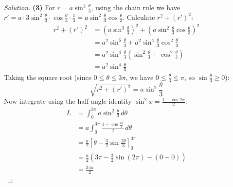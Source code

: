 \documentclass[11pt]{article}
\theoremstyle{definition}
\newenvironment{solution}{\begin{proof}[Solution]}{\end{proof}}
\begin{document}
\begin{solution}
\textbf{(3)} For $r=a\sin^3\frac{\theta}{3}$, using the chain rule we have $r' = a \cdot 3\sin^2\frac{\theta}{3} \cdot \cos\frac{\theta}{3} \cdot \frac{1}{3} = a\sin^2\frac{\theta}{3}\cos\frac{\theta}{3}$.
Calculate $r^2 + (r')^2$:
\begin{align*}
r^2 + (r')^2 &= \left(a\sin^3\frac{\theta}{3}\right)^2 + \left(a\sin^2\frac{\theta}{3}\cos\frac{\theta}{3}\right)^2 \\
&= a^2\sin^6\frac{\theta}{3} + a^2\sin^4\frac{\theta}{3}\cos^2\frac{\theta}{3} \\
&= a^2\sin^4\frac{\theta}{3} \left(\sin^2\frac{\theta}{3} + \cos^2\frac{\theta}{3}\right) \\
&= a^2\sin^4\frac{\theta}{3}
\end{align*}
Taking the square root (since $0 \leq \theta \leq 3\pi$, we have $0 \leq \frac{\theta}{3} \leq \pi$, so $\sin\frac{\theta}{3} \geq 0$):
\[
\sqrt{r^2 + (r')^2} = a\sin^2\frac{\theta}{3}
\]
Now integrate using the half-angle identity $\sin^2 x = \frac{1-\cos2x}{2}$:
\begin{align*}
L &= \int_{0}^{3\pi} a\sin^2\frac{\theta}{3} \,d\theta \\
&= a \int_{0}^{3\pi} \frac{1 - \cos\frac{2\theta}{3}}{2} \,d\theta \\
&= \frac{a}{2} \left[ \theta - \frac{3}{2}\sin\frac{2\theta}{3} \right]_0^{3\pi} \\
&= \frac{a}{2} \left( 3\pi - \frac{3}{2}\sin(2\pi) - (0 - 0) \right) \\
&= \frac{3\pi a}{2}
\end{align*}

\end{solution}
\end{document}
